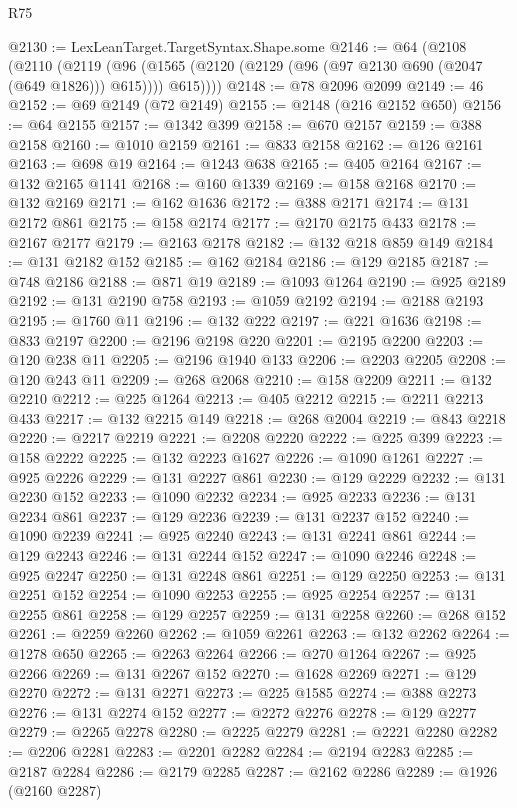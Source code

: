 \begin{lexlean}{R75}
\begin{coremodule}
@2130 := LexLeanTarget.TargetSyntax.Shape.some
@2146 := @64
    (@2108
      (@2110
        (@2119
          (@96 (@1565 (@2120 (@2129 (@96 (@97 @2130 @690 (@2047 (@649 @1826))) @615)))) @615))))
@2148 := @78 @2096 @2099
@2149 := 46
@2152 := @69 @2149 (@72 @2149)
@2155 := @2148 (@216 @2152 @650)
@2156 := @64 @2155
@2157 := @1342 @399
@2158 := @670 @2157
@2159 := @388 @2158
@2160 := @1010 @2159
@2161 := @833 @2158
@2162 := @126 @2161
@2163 := @698 @19
@2164 := @1243 @638
@2165 := @405 @2164
@2167 := @132 @2165 @1141
@2168 := @160 @1339
@2169 := @158 @2168
@2170 := @132 @2169
@2171 := @162 @1636
@2172 := @388 @2171
@2174 := @131 @2172 @861
@2175 := @158 @2174
@2177 := @2170 @2175 @433
@2178 := @2167 @2177
@2179 := @2163 @2178
@2182 := @132 @218 @859 @149
@2184 := @131 @2182 @152
@2185 := @162 @2184
@2186 := @129 @2185
@2187 := @748 @2186
@2188 := @871 @19
@2189 := @1093 @1264
@2190 := @925 @2189
@2192 := @131 @2190 @758
@2193 := @1059 @2192
@2194 := @2188 @2193
@2195 := @1760 @11
@2196 := @132 @222
@2197 := @221 @1636
@2198 := @833 @2197
@2200 := @2196 @2198 @220
@2201 := @2195 @2200
@2203 := @120 @238 @11
@2205 := @2196 @1940 @133
@2206 := @2203 @2205
@2208 := @120 @243 @11
@2209 := @268 @2068
@2210 := @158 @2209
@2211 := @132 @2210
@2212 := @225 @1264
@2213 := @405 @2212
@2215 := @2211 @2213 @433
@2217 := @132 @2215 @149
@2218 := @268 @2004
@2219 := @843 @2218
@2220 := @2217 @2219
@2221 := @2208 @2220
@2222 := @225 @399
@2223 := @158 @2222
@2225 := @132 @2223 @1627
@2226 := @1090 @1261
@2227 := @925 @2226
@2229 := @131 @2227 @861
@2230 := @129 @2229
@2232 := @131 @2230 @152
@2233 := @1090 @2232
@2234 := @925 @2233
@2236 := @131 @2234 @861
@2237 := @129 @2236
@2239 := @131 @2237 @152
@2240 := @1090 @2239
@2241 := @925 @2240
@2243 := @131 @2241 @861
@2244 := @129 @2243
@2246 := @131 @2244 @152
@2247 := @1090 @2246
@2248 := @925 @2247
@2250 := @131 @2248 @861
@2251 := @129 @2250
@2253 := @131 @2251 @152
@2254 := @1090 @2253
@2255 := @925 @2254
@2257 := @131 @2255 @861
@2258 := @129 @2257
@2259 := @131 @2258
@2260 := @268 @152
@2261 := @2259 @2260
@2262 := @1059 @2261
@2263 := @132 @2262
@2264 := @1278 @650
@2265 := @2263 @2264
@2266 := @270 @1264
@2267 := @925 @2266
@2269 := @131 @2267 @152
@2270 := @1628 @2269
@2271 := @129 @2270
@2272 := @131 @2271
@2273 := @225 @1585
@2274 := @388 @2273
@2276 := @131 @2274 @152
@2277 := @2272 @2276
@2278 := @129 @2277
@2279 := @2265 @2278
@2280 := @2225 @2279
@2281 := @2221 @2280
@2282 := @2206 @2281
@2283 := @2201 @2282
@2284 := @2194 @2283
@2285 := @2187 @2284
@2286 := @2179 @2285
@2287 := @2162 @2286
@2289 := @1926 (@2160 @2287)

\end{coremodule}
\end{lexlean}
